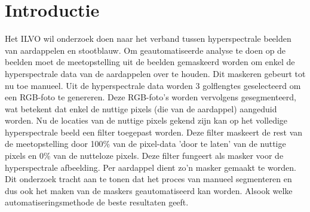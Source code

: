 
\section{Introductie}%
\label{sec:introductie}


Het ILVO wil onderzoek doen naar het verband tussen hyperspectrale beelden van aardappelen en stootblauw. Om geautomatiseerde analyse te doen op de beelden moet de meetopstelling uit de beelden gemaskeerd worden om enkel de hyperspectrale data van de aardappelen over te houden. Dit maskeren gebeurt tot nu toe manueel. Uit de hyperspectrale data worden 3 golflengtes geselecteerd om een RGB-foto te genereren. Deze RGB-foto's worden vervolgens gesegmenteerd, wat betekent dat enkel de nuttige pixels (die van de aardappel) aangeduid worden. Nu de locaties van de nuttige pixels gekend zijn kan op het volledige hyperspectrale beeld een filter toegepast worden. Deze filter maskeert de rest van de meetopstelling door 100\% van de pixel-data 'door te laten' van de nuttige pixels en 0\% van de nutteloze pixels. Deze filter fungeert als masker voor de hyperspectrale afbeelding. Per aardappel dient zo'n masker gemaakt te worden.
Dit onderzoek tracht aan te tonen dat het proces van manueel segmenteren en dus ook het maken van de maskers geautomatiseerd kan worden. Alsook welke automatiseringsmethode de beste resultaten geeft.

